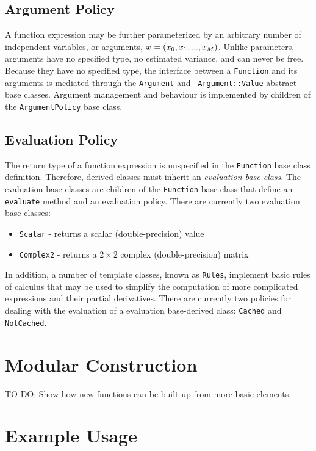 \documentclass[12pt]{article}
\newcommand{\mbf}[1]{\mbox{\boldmath $#1$}}
\begin{document}
\subsection{Argument Policy}

A function expression may be further parameterized by an arbitrary number
of independent variables, or arguments, ${\mbf x}=(x_0, x_1, ... ,
x_M)$.  Unlike parameters, arguments have no specified type, no
estimated variance, and can never be free.  Because they have no
specified type, the interface between a {\tt Function} and its
arguments is mediated through the {\tt Argument} and {\tt
Argument::Value} abstract base classes.  Argument management and
behaviour is implemented by children of the {\tt ArgumentPolicy} base
class.

\subsection{Evaluation Policy}

The return type of a function expression is unspecified in the 
{\tt Function} base class definition.  Therefore, derived classes must 
inherit an {\em evaluation base class}.  The evaluation base classes are 
children of the {\tt Function} base class that define an {\tt evaluate} method
and an evaluation policy.  There are currently two evaluation base
classes:
\begin{itemize}
\item {\tt Scalar} - returns a scalar (double-precision) value
\item {\tt Complex2} - returns a $2\times2$ complex (double-precision) matrix
\end{itemize}
In addition, a number of template classes, known as {\tt Rules},
implement basic rules of calculus that may be used to simplify the
computation of more complicated expressions and their partial
derivatives.  There are currently two policies for dealing with the
evaluation of a evaluation base-derived class: {\tt Cached} and {\tt
NotCached}.

\section{Modular Construction}

TO DO: Show how new functions can be built up from more basic elements.

\section{Example Usage}
\end{document}
